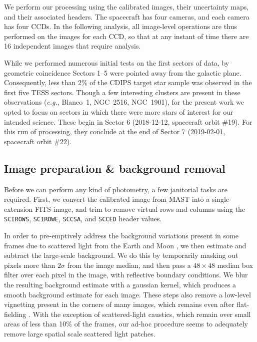 \documentclass[12pt,twocolumn,tighten]{aastex62}
\begin{document}
We perform our processing using the calibrated images, their
uncertainty maps, and their associated headers.  The spacecraft has
four cameras, and each camera has four CCDs.  In the following
analysis, all image-level operations are thus performed on the images
for each CCD, so that at any instant of time there are 16 independent
images that require analysis.

While we performed numerous initial tests on the first sectors of
data, by geometric coincidence Sectors 1--5 were pointed away from the
galactic plane.  Consequently, less than 2\% of the CDIPS target star
sample was observed in the first five TESS sectors.  Though a few
interesting clusters are present in these observations ({\it e.g.},
Blanco~1, NGC~2516, NGC~1901), for the present work we opted to focus
on sectors in which there were more stars of interest for our intended
science.  These begin in Sector 6 (2018-12-12, spacecraft orbit \#19).
For this run of processing, they conclude at the end of Sector 7
(2019-02-01, spacecraft orbit \#22).

\subsection{Image preparation \& background removal}
\label{subsec:preparation}

Before we can perform any kind of photometry, a few janitorial tasks
are required.
First, we convert the calibrated image from MAST into a
single-extension FITS image, and trim to remove virtual rows and
columns using the \texttt{SCIROWS}, \texttt{SCIROWE}, \texttt{SCCSA},
and \texttt{SCCED} header values.

In order to pre-emptively address the background variations present in
some frames due to scattered light from the Earth and Moon
\citep[see][\S 7.3.1--7.3.4]{vanderspek_2018}, we then estimate and
subtract the large-scale background.  We do this by temporarily
masking out pixels more than $2\sigma$ from the image median, and then
pass a $48\times48$ median box filter over each pixel in the image,
with reflective boundary conditions.  We blur the resulting background
estimate with a gaussian kernel, which produces a smooth background
estimate for each image.  These steps also remove a low-level
vignetting present in the corners of many images, which remains even
after flat-fielding \citep[see][\S 7.3.5]{vanderspek_2018}.  With the
exception of scattered-light caustics, which remain over small areas
of less than 10\% of the frames, our ad-hoc procedure seems to
adequately remove large spatial scale scattered light patches.
\end{document}
